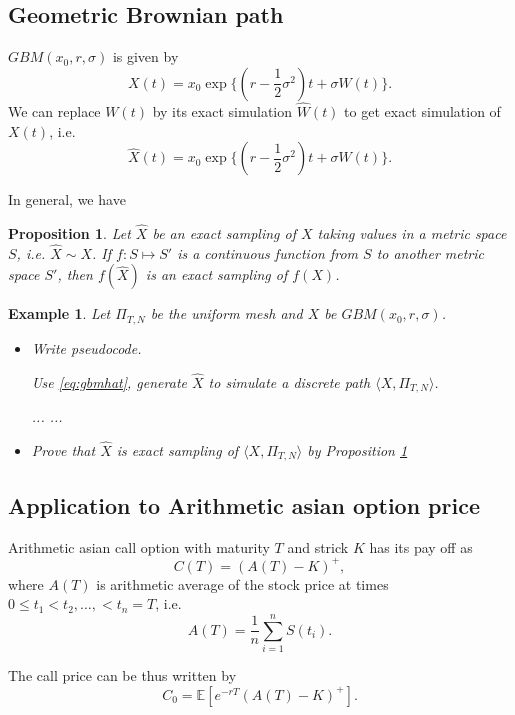 \documentclass{article}
\newtheorem{proposition}[theorem]{Proposition}
\newtheorem{example}{Example}
\begin{document}
\subsection{Geometric Brownian path}
$GBM(x_0, r, \sigma)$  is given by
$$X(t) = x_0 \exp\{(r - \frac 1 2 \sigma^2)t + \sigma W(t)\}.$$
We can replace $W(t)$ by its exact simulation $\hat W(t)$ to get exact simulation of $X(t)$, i.e.
\begin{equation}\label{eq:gbmhat}
\hat X(t) = x_0 \exp\{(r - \frac 1 2 \sigma^2)t + \sigma \hat W(t)\}.
\end{equation}

In general, we have
\begin{proposition}\label{p:01}
Let $\hat X$ be an exact sampling of $X$ taking values in a metric space $S$, i.e. $\hat X \sim X$. 
If $f: S\mapsto S'$ is a continuous function from $S$ to another metric space $S'$, then 
$f(\hat X)$ is an exact sampling of $f(X)$.
\end{proposition}


\begin{example}\label{exm:gbm}
Let $\Pi_{T, N}$ be the uniform mesh and $X$ be $GBM(x_0, r, \sigma)$.
\begin{itemize}
\item 
Write pseudocode.
\begin{algorithm}
\caption{ Use  \eqref{eq:gbmhat}, generate $\hat X$ to simulate a discrete path $\langle X, \Pi_{T, N}\rangle$.  }
\label{alg:gbm}
\begin{algorithmic}[1]
\State   ...
\State  ...
\EndProcedure
\end{algorithmic}
\end{algorithm}
\item Prove that $\hat X$ is exact sampling of $\langle X, \Pi_{T, N}\rangle$ by Proposition \ref{p:01}
\end{itemize}
\end{example}

\subsection{Application to Arithmetic asian option price}
Arithmetic asian call option with maturity $T$ and strick $K$ has its pay off as
$$C(T) = (A(T) - K)^+,$$
where $A(T)$ is arithmetic average of the stock price at times
$0 \le t_1 < t_2, \ldots, < t_n = T$, i.e.
$$A(T) = \frac{1}{n} \sum_{i=1}^n S(t_i).$$

The call price can be thus written by
$$C_0 = \mathbb E [e^{-rT} (A(T) - K)^+].$$
\end{document}
